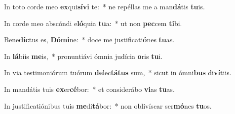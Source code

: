 \item In toto corde meo \textbf{ex}qui\textbf{sí}\textbf{vi} te:~* ne repéllas me a man\textbf{dá}tis \textbf{tu}is.
\item In corde meo abscóndi e\textbf{ló}quia \textbf{tu}a:~* ut non \textbf{pec}cem \textbf{ti}bi.
\item Bene\textbf{díc}tus es, \textbf{Dó}\textbf{mi}ne:~* doce me justificati\textbf{ó}nes \textbf{tu}as.
\item In \textbf{lá}biis \textbf{me}is,~* pronuntiávi ómnia judícia \textbf{o}ris \textbf{tu}i.
\item In via testimoniórum tuórum \textbf{de}lec\textbf{tá}\textbf{tus} sum,~* sicut in ómni\textbf{bus} di\textbf{ví}tiis.
\item In mandátis tuis \textbf{ex}er\textbf{cé}bor:~* et considerábo \textbf{vi}as \textbf{tu}as.
\item In justificatiónibus tuis \textbf{me}di\textbf{tá}bor:~* non oblivíscar ser\textbf{mó}nes \textbf{tu}os.
